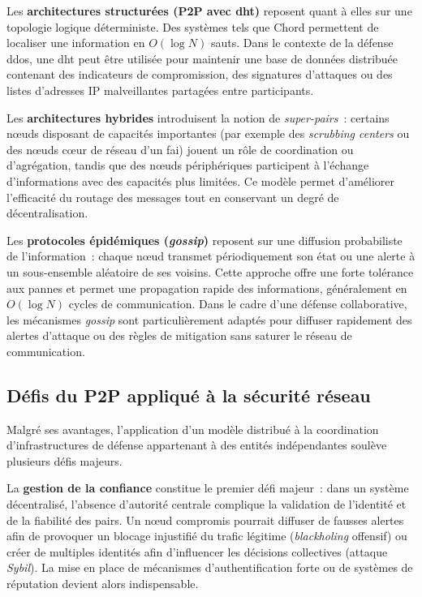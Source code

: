 Les \textbf{architectures structurées (P2P avec \gls{dht})} reposent quant à elles sur une topologie logique déterministe. Des systèmes tels que Chord \parencite{stoica2001chord} permettent de localiser une information en $O(\log N)$ sauts. Dans le contexte de la défense \gls{ddos}, une \gls{dht} peut être utilisée pour maintenir une base de données distribuée contenant des indicateurs de compromission, des signatures d'attaques ou des listes d'adresses IP malveillantes partagées entre participants.

Les \textbf{architectures hybrides} introduisent la notion de \textit{super-pairs}~: certains n\oe{}uds disposant de capacités importantes (par exemple des \textit{scrubbing centers} ou des n\oe{}uds c\oe{}ur de réseau d'un \gls{fai}) jouent un rôle de coordination ou d'agrégation, tandis que des n\oe{}uds périphériques participent à l'échange d'informations avec des capacités plus limitées. Ce modèle permet d'améliorer l'efficacité du routage des messages tout en conservant un degré de décentralisation.

Les \textbf{protocoles épidémiques (\textit{gossip})} reposent sur une diffusion probabiliste de l'information~: chaque n\oe{}ud transmet périodiquement son état ou une alerte à un sous-ensemble aléatoire de ses voisins. Cette approche offre une forte tolérance aux pannes et permet une propagation rapide des informations, généralement en $O(\log N)$ cycles de communication. Dans le cadre d'une défense collaborative, les mécanismes \textit{gossip} sont particulièrement adaptés pour diffuser rapidement des alertes d'attaque ou des règles de mitigation sans saturer le réseau de communication.

\subsection{Défis du P2P appliqué à la sécurité réseau}

Malgré ses avantages, l'application d'un modèle distribué à la coordination d'infrastructures de défense appartenant à des entités indépendantes soulève plusieurs défis majeurs.

La \textbf{gestion de la confiance} constitue le premier défi majeur~: dans un système décentralisé, l'absence d'autorité centrale complique la validation de l'identité et de la fiabilité des pairs. Un n\oe{}ud compromis pourrait diffuser de fausses alertes afin de provoquer un blocage injustifié du trafic légitime (\textit{blackholing} offensif) ou créer de multiples identités afin d'influencer les décisions collectives (attaque \textit{Sybil}). La mise en place de mécanismes d'authentification forte ou de systèmes de réputation devient alors indispensable.

